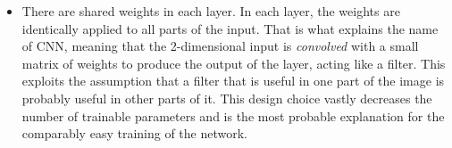 \documentclass[a4paper]{article}
\begin{document}
\begin{itemize}
			\item There are shared weights in each layer. In each layer, the weights are identically applied to all parts of the input. That is what explains the name of CNN, meaning that the 2-dimensional input is \textit{convolved} with a small matrix of weights to produce the output of the layer, acting like a filter. This exploits the assumption that a filter that is useful in one part of the image is probably useful in other parts of it. This design choice vastly decreases the number of trainable parameters and is the most probable explanation for the comparably easy training of the network.
		\end{itemize}
\end{document}
